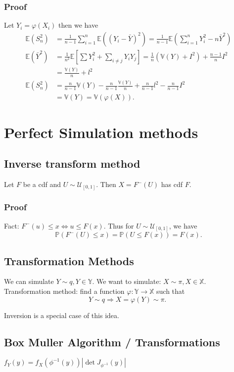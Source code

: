\documentclass{article}
\begin{document}
\subsubsection{Proof}
Let $Y_i=\varphi\left(X_i\right)$ then we have
$$
\begin{aligned}
\mathbb{E}\left(S_n^2\right) & =\frac{1}{n-1} \sum_{i=1}^n \mathbb{E}\left(\left(Y_i-\bar{Y}\right)^2\right)=\frac{1}{n-1} \mathbb{E}\left(\sum_{i=1}^n Y_i^2-n \bar{Y}^2\right) \\
\mathbb{E}\left(\bar{Y}^2\right) & =\frac{1}{n^2} \mathbb{E}\left[\sum Y_i^2+\sum_{i \neq j} Y_i Y_j\right]=\frac{1}{n}\left(\mathbb{V}(Y)+I^2\right)+\frac{n-1}{n} I^2 \\
& =\frac{\mathbb{V}(Y)}{n}+l^2 \\
\mathbb{E}\left(S_n^2\right) & =\frac{n}{n-1} \mathbb{V}(Y)-\frac{n}{n-1} \frac{\mathbb{V}(Y)}{n}+\frac{n}{n-1} l^2-\frac{n}{n-1} I^2 \\
& =\mathbb{V}(Y)=\mathbb{V}(\varphi(X)) .
\end{aligned}
$$

\section{Perfect Simulation methods}
\subsection{Inverse transform method}
Let $F$ be a cdf and $U \sim \mathcal{U}_{[0,1]}$. Then $X=F^{-}(U)$ has cdf $F$.

\subsubsection{Proof}
Fact: $F^{-}(u) \leq x \Leftrightarrow u \leq F(x)$.
Thus for $U \sim \mathcal{U}_{[0,1]}$, we have
$$
\mathbb{P}\left(F^{-}(U) \leq x\right)=\mathbb{P}(U \leq F(x))=F(x) .
$$
\subsection{Transformation Methods}
We can simulate $Y \sim q, Y \in \mathbb{Y}$.
We want to simulate: $X \sim \pi, X \in \mathbb{X}$.
Transformation method: find a function $\varphi: \mathbb{Y} \rightarrow \mathbb{X}$ such that
$$
Y \sim q \Longrightarrow X=\varphi(Y) \sim \pi \text {. }
$$

Inversion is a special case of this idea.

\subsection{Box Muller Algorithm / Transformations}
$f_Y(y)=f_X\left(\phi^{-1}(y)\right)\left|\operatorname{det} J_{\phi^{-1}}(y)\right|$
\end{document}
